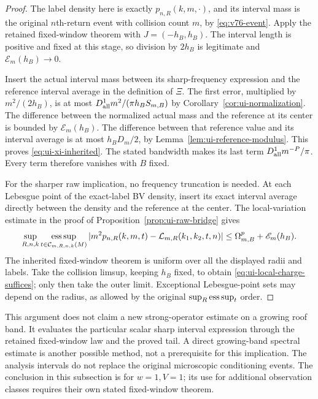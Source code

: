 \begin{proof}
The label density here is exactly $p_{n,R}(k,m,\cdot)$, and its
interval mass is the original $n$th-return event with collision
count $m$, by \eqref{eq:v76-event}. Apply the retained fixed-window
theorem with $J=(-h_B,h_B)$. The interval length is positive and
fixed at this stage, so division by $2h_B$ is legitimate and
$\mathscr E_m(h_B)\to0$.

Insert the actual interval mass between its sharp-frequency
expression and the reference interval average in the definition
of $\Xi$. The first error, multiplied by $m^2/(2h_B)$, is at most
$D_{\rm all}^{1}m^2/(\pi h_BS_{m,B})$ by
Corollary~\ref{cor:ui-normalization}. The difference between the
normalized actual mass and the reference at its center is bounded
by $\mathscr E_m(h_B)$. The difference between that reference
value and its interval average is at most $h_BD_m/2$, by
Lemma~\ref{lem:ui-reference-modulus}. This proves
\eqref{eq:ui-xi-inherited}. The stated bandwidth makes its last
term $D_{\rm all}^{1}m^{-P}/\pi$. Every term therefore vanishes
with $B$ fixed.

For the sharper raw implication, no frequency truncation is
needed. At each Lebesgue point of the exact-label BV density,
insert its exact interval average directly between the density
and the reference at the center. The local-variation estimate in
the proof of Proposition~\ref{prop:ui-raw-bridge} gives
\[
 \sup_{R,n,k}\operatorname*{ess\,sup}_{t\in\mathcal C_{m,R,n,k}(M)}
  |m^2p_{n,R}(k,m,t)-\mathcal L_{m,R}(k_1,k_2,t,n)|
       \le\Omega^p_{m,B}+\mathscr E_m(h_B).
\]
The inherited fixed-window theorem is uniform over all the
displayed radii and labels. Take the collision limsup, keeping
$h_B$ fixed, to obtain \eqref{eq:ui-local-charge-suffices}; only
then take the outer limit. Exceptional Lebesgue-point sets may
depend on the radius, as allowed by the original
$\sup_R\operatorname*{ess\,sup}_t$ order.
\end{proof}

This argument does not claim a new strong-operator estimate on a
growing roof band. It evaluates the particular scalar sharp
interval expression through the retained fixed-window law and
the proved tail. A direct growing-band spectral estimate is
another possible method, not a prerequisite for this implication.
The analysis intervals do not replace the original microscopic
conditioning events. The conclusion in this subsection is for
$w=1,V=1$; its use for additional observation classes requires
their own stated fixed-window theorem.

